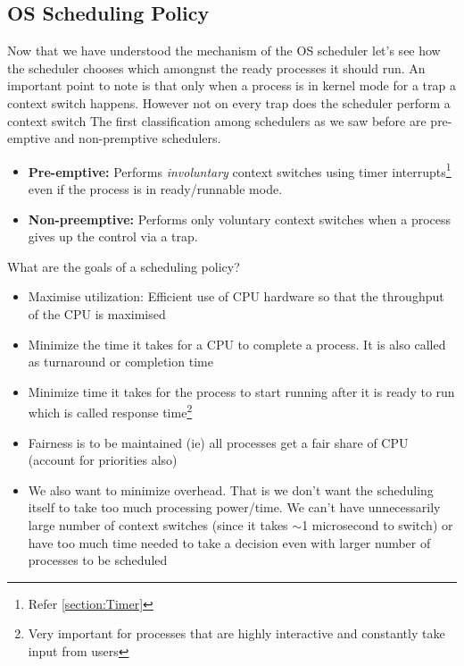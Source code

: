 \documentclass[12pt]{article}
\begin{document}
\subsection{OS Scheduling Policy}
Now that we have understood the mechanism of the OS scheduler let's see how the scheduler chooses which amongnst the 
ready processes it should run. An important point to note is that only when a process is in kernel mode for a trap a context switch happens. However not on every trap does the scheduler perform a context switch
The first classification among schedulers as we saw before are pre-emptive and non-premptive schedulers.
\begin{itemize}[topsep=0pt, partopsep=0pt, itemsep=0pt, parsep=0pt]
    \item \textbf{Pre-emptive:} Performs \textit{involuntary} context switches using timer interrupts\footnote{Refer \ref{section:Timer}}
    even if the process is in ready/runnable mode.
    \item \textbf{Non-preemptive:} Performs only voluntary context switches when a process gives up the control via a trap.
\end{itemize}

What are the goals of a scheduling policy?
\begin{itemize}[topsep=0pt, partopsep=0pt, itemsep=0pt, parsep=0pt]
    \item Maximise utilization: Efficient use of CPU hardware so that the throughput of the CPU is maximised
    \item Minimize the time it takes for a CPU to complete a process. It is also called as turnaround or completion time
    \item Minimize time it takes for the process to start running after it is ready to run which is called response time\footnote{Very important for processes that are highly interactive and constantly take input from users}
    \item Fairness is to be maintained (ie) all processes get a fair share of CPU (account for priorities also)
    \item We also want to minimize overhead. That is we don't want the scheduling itself to take too much processing power/time.
    We can't have unnecessarily large number of context switches (since it takes \(\sim \)1 microsecond to switch) or have too much time needed to take a decision even with larger number of processes to be scheduled
\end{itemize}
\end{document}
